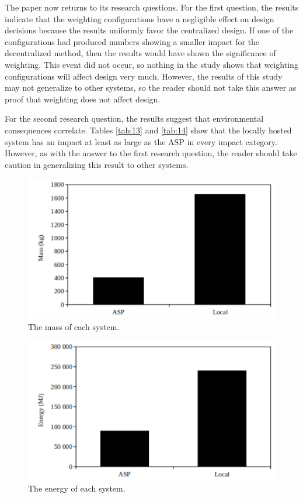 \documentclass[final,journal,10pt,letterpaper,oneside,twocolumn,compsoc]%
{IEEEtran}
\begin{document}
The paper now returns to its research questions. For the first question, the
results indicate that the weighting
configurations have a negligible effect on design decisions because the results
uniformly favor the centralized design. If one of the configurations had
produced
numbers showing a smaller impact for the decentralized method, then the results
would have shown the significance of weighting. This event did not occur, so
nothing in the study shows that weighting configurations will affect design very
much. However, the results of this study may not generalize to other systems, so
the reader should not take this answer as proof that weighting does not affect
design.

For the second research question, the results suggest that environmental
consequences
correlate. Tables \ref{tab:13} and \ref{tab:14} show that the locally hosted
system has
an impact at least as large as the ASP in every impact category. However, as
with the answer to the first research question, the
reader should take caution in generalizing this result to other systems.

\begin{figure}[t!]
  \centering
    \includegraphics[scale=0.55]{mass}
  \caption{The mass of each system.}
  \label{fig:tab3}
\end{figure}
\begin{figure}[t]
  \centering
    \includegraphics[scale=0.55]{energy}
  \caption{The energy of each system.}
  \label{fig:tab4}
\end{figure}
\end{document}
